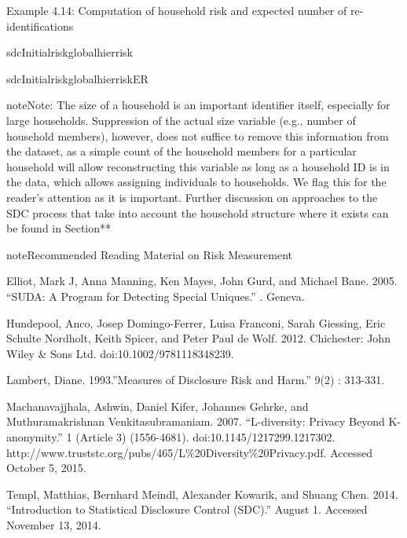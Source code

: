 \documentclass[letterpaper,10pt,english]{sphinxmanual}
\begin{document}
Example 4.14: Computation of household risk and expected number of
re-identifications

%
\begin{sphinxVerbatim}[commandchars=\\\{\}]
sdcInitialriskglobalhier\PYGZus{}risk

sdcInitialriskglobalhier\PYGZus{}risk\PYGZus{}ER
\end{sphinxVerbatim}

\begin{sphinxadmonition}{note}{Note:}
The size of a household is an important identifier itself,
especially for large households. Suppression of the actual size variable
(e.g., number of household members), however, does not suffice to remove
this information from the dataset, as a simple count of the household
members for a particular household will allow reconstructing this
variable as long as a household ID is in the data, which allows
assigning individuals to households. We flag this for the reader’s
attention as it is important. Further discussion on approaches to the
SDC process that take into account the household structure where it
exists can be found in Section** 
\end{sphinxadmonition}

\begin{sphinxadmonition}{note}{Recommended Reading Material on Risk Measurement}

Elliot, Mark J, Anna Manning, Ken Mayes, John Gurd, and Michael Bane.
2005. “SUDA: A Program for Detecting Special Uniques.” .
Geneva.

Hundepool, Anco, Josep Domingo-Ferrer, Luisa Franconi, Sarah Giessing,
Eric Schulte Nordholt, Keith Spicer, and Peter Paul de Wolf. 2012.
 Chichester: John Wiley \& Sons Ltd.
doi:10.1002/9781118348239.

Lambert, Diane. 1993.”Measures of Disclosure Risk and Harm.”  9(2) : 313-331.

Machanavajjhala, Ashwin, Daniel Kifer, Johannes Gehrke, and
Muthuramakrishnan Venkitasubramaniam. 2007. “L-diversity: Privacy Beyond
K-anonymity.”  1 (Article 3)
(1556-4681). doi:10.1145/1217299.1217302.
http://www.truststc.org/pubs/465/L\%20Diversity\%20Privacy.pdf. Accessed
October 5, 2015.

Templ, Matthias, Bernhard Meindl, Alexander Kowarik, and Shuang Chen.
2014. “Introduction to Statistical Disclosure Control (SDC).”
August 1. Accessed November 13, 2014.
\end{sphinxadmonition}
\end{document}
